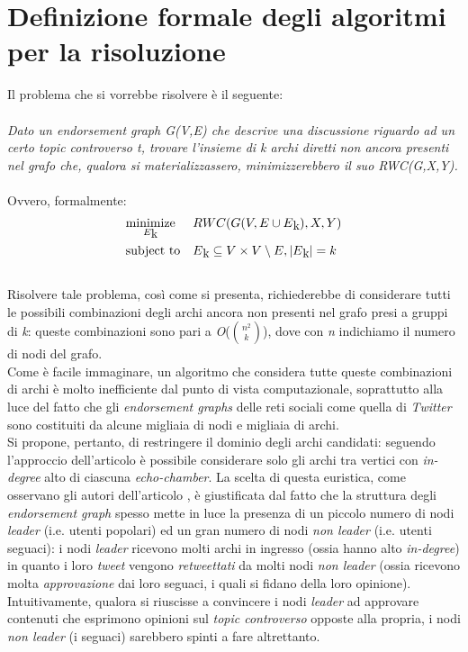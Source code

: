 \section{Definizione formale degli algoritmi per la risoluzione}
Il problema che si vorrebbe risolvere è il seguente: 
\\\\
\textit{Dato un endorsement graph G(V,E) che descrive una discussione riguardo ad un certo topic controverso t, trovare l'insieme di k archi diretti non ancora presenti nel grafo che, qualora si materializzassero, minimizzerebbero il suo RWC(G,X,Y).}
\\\\
Ovvero, formalmente:
\\
\begin{equation*}
\begin{aligned}
& \underset{E\textsubscript{k}}{\text{minimize}}
& & RWC(G(V, E \cup E\textsubscript{k}),X,Y) \\
& \text{subject to}
& & E\textsubscript{k} \subseteq V \times V \setminus E, \left|{E\textsubscript{k}}\right| = k
\end{aligned}
\end{equation*}
\\
Risolvere tale problema, così come si presenta, richiederebbe di considerare tutti le possibili combinazioni degli archi ancora non presenti nel grafo presi a gruppi di \textit{k}: queste combinazioni sono pari a \textit{O}($n^2 \choose k$), dove con \textit{n} indichiamo il numero di nodi del grafo.
\\Come è facile immaginare, un algoritmo che considera tutte queste combinazioni di archi è molto inefficiente dal punto di vista computazionale, soprattutto alla luce del fatto che gli \textit{endorsement graphs} delle reti sociali come quella di \textit{Twitter} sono costituiti da alcune migliaia di nodi e migliaia di archi.
\\Si propone, pertanto, di restringere il dominio degli archi candidati: seguendo l'approccio dell'articolo \cite{garimella:paper} è possibile considerare solo gli archi tra vertici con \textit{in-degree} alto di ciascuna \textit{echo-chamber}. La scelta di questa euristica, come osservano gli autori dell'articolo \cite{garimella:paper}, è giustificata dal fatto che la struttura degli \textit{endorsement graph} spesso mette in luce la presenza di un piccolo numero di nodi \textit{leader} (i.e. utenti popolari) ed un gran numero di nodi \textit{non leader} (i.e. utenti seguaci): i nodi \textit{leader} ricevono molti archi in ingresso (ossia hanno alto \textit{in-degree}) in quanto i loro \textit{tweet} vengono \textit{retweettati} da molti nodi \textit{non leader} (ossia ricevono molta \textit{approvazione} dai loro seguaci, i quali si fidano della loro opinione). Intuitivamente, qualora si riuscisse a convincere i nodi \textit{leader} ad approvare contenuti che esprimono opinioni sul \textit{topic controverso} opposte alla propria, i nodi \textit{non leader} (i seguaci) sarebbero spinti a fare altrettanto.
